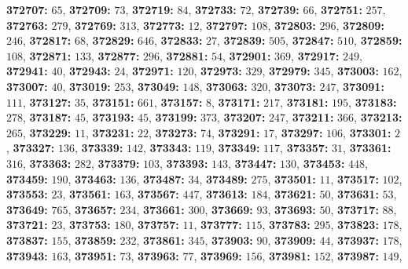 \textsf{\bfseries 372707:} $65$, \textsf{\bfseries 372709:} $73$, \textsf{\bfseries 372719:} $84$, \textsf{\bfseries 372733:} $72$, \textsf{\bfseries 372739:} $66$, \textsf{\bfseries 372751:} $257$, \textsf{\bfseries 372763:} $279$, \textsf{\bfseries 372769:} $313$, \textsf{\bfseries 372773:} $12$, \textsf{\bfseries 372797:} $108$, \textsf{\bfseries 372803:} $296$, \textsf{\bfseries 372809:} $246$, \textsf{\bfseries 372817:} $68$, \textsf{\bfseries 372829:} $646$, \textsf{\bfseries 372833:} $27$, \textsf{\bfseries 372839:} $505$, \textsf{\bfseries 372847:} $510$, \textsf{\bfseries 372859:} $108$, \textsf{\bfseries 372871:} $133$, \textsf{\bfseries 372877:} $296$, \textsf{\bfseries 372881:} $54$, \textsf{\bfseries 372901:} $369$, \textsf{\bfseries 372917:} $249$, \textsf{\bfseries 372941:} $40$, \textsf{\bfseries 372943:} $24$, \textsf{\bfseries 372971:} $120$, \textsf{\bfseries 372973:} $329$, \textsf{\bfseries 372979:} $345$, \textsf{\bfseries 373003:} $162$, \textsf{\bfseries 373007:} $40$, \textsf{\bfseries 373019:} $253$, \textsf{\bfseries 373049:} $148$, \textsf{\bfseries 373063:} $320$, \textsf{\bfseries 373073:} $247$, \textsf{\bfseries 373091:} $111$, \textsf{\bfseries 373127:} $35$, \textsf{\bfseries 373151:} $661$, \textsf{\bfseries 373157:} $8$, \textsf{\bfseries 373171:} $217$, \textsf{\bfseries 373181:} $195$, \textsf{\bfseries 373183:} $278$, \textsf{\bfseries 373187:} $45$, \textsf{\bfseries 373193:} $45$, \textsf{\bfseries 373199:} $373$, \textsf{\bfseries 373207:} $247$, \textsf{\bfseries 373211:} $366$, \textsf{\bfseries 373213:} $265$, \textsf{\bfseries 373229:} $11$, \textsf{\bfseries 373231:} $22$, \textsf{\bfseries 373273:} $74$, \textsf{\bfseries 373291:} $17$, \textsf{\bfseries 373297:} $106$, \textsf{\bfseries 373301:} $2$, \textsf{\bfseries 373327:} $136$, \textsf{\bfseries 373339:} $142$, \textsf{\bfseries 373343:} $119$, \textsf{\bfseries 373349:} $117$, \textsf{\bfseries 373357:} $31$, \textsf{\bfseries 373361:} $316$, \textsf{\bfseries 373363:} $282$, \textsf{\bfseries 373379:} $103$, \textsf{\bfseries 373393:} $143$, \textsf{\bfseries 373447:} $130$, \textsf{\bfseries 373453:} $448$, \textsf{\bfseries 373459:} $190$, \textsf{\bfseries 373463:} $136$, \textsf{\bfseries 373487:} $34$, \textsf{\bfseries 373489:} $275$, \textsf{\bfseries 373501:} $11$, \textsf{\bfseries 373517:} $102$, \textsf{\bfseries 373553:} $23$, \textsf{\bfseries 373561:} $163$, \textsf{\bfseries 373567:} $447$, \textsf{\bfseries 373613:} $184$, \textsf{\bfseries 373621:} $50$, \textsf{\bfseries 373631:} $53$, \textsf{\bfseries 373649:} $765$, \textsf{\bfseries 373657:} $234$, \textsf{\bfseries 373661:} $300$, \textsf{\bfseries 373669:} $93$, \textsf{\bfseries 373693:} $50$, \textsf{\bfseries 373717:} $88$, \textsf{\bfseries 373721:} $23$, \textsf{\bfseries 373753:} $180$, \textsf{\bfseries 373757:} $11$, \textsf{\bfseries 373777:} $115$, \textsf{\bfseries 373783:} $295$, \textsf{\bfseries 373823:} $178$, \textsf{\bfseries 373837:} $155$, \textsf{\bfseries 373859:} $232$, \textsf{\bfseries 373861:} $345$, \textsf{\bfseries 373903:} $90$, \textsf{\bfseries 373909:} $44$, \textsf{\bfseries 373937:} $178$, \textsf{\bfseries 373943:} $163$, \textsf{\bfseries 373951:} $73$, \textsf{\bfseries 373963:} $77$, \textsf{\bfseries 373969:} $156$, \textsf{\bfseries 373981:} $152$, \textsf{\bfseries 373987:} $149$, 
